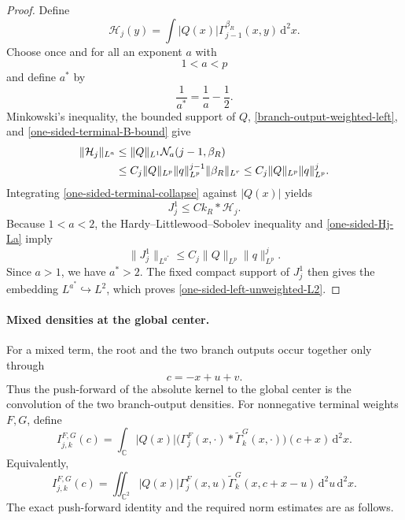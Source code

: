 \documentclass[a4paper,11pt]{article}
\newcommand{\C}{\mathbb{C}}
\newcommand{\dd}{\,\text{d}}
\theoremstyle{plain}
\theoremstyle{definition}
\theoremstyle{remark}
\begin{document}
\begin{proof}
Define
\begin{equation}\label{one-sided-Hj-def}
 \mathcal H_j(y)=\int |Q(x)|\Gamma_{j-1}^{\beta_R}(x,y)\dd^2x.
\end{equation}
Choose once and for all an exponent $a$ with
\begin{equation}\label{one-sided-a-choice}
 1<a<p
\end{equation}
and define $a^*$ by
\begin{equation}\label{one-sided-astar-def}
 \frac1{a^*}=\frac1a-\frac12.
\end{equation}
Minkowski's inequality, the bounded support of $Q$,
\eqref{branch-output-weighted-left}, and
\eqref{one-sided-terminal-B-bound} give
\begin{align}
 \|\mathcal H_j\|_{L^a}
 &\le \|Q\|_{L^1}\mathcal N_a(j-1,\beta_R) \notag\\
 &\le C_j\|Q\|_{L^p}\|q\|_{L^p}^{j-1}\|\beta_R\|_{L^r}
 \le C_j\|Q\|_{L^p}\|q\|_{L^p}^{j}.
 \label{one-sided-Hj-La}
\end{align}
Integrating \eqref{one-sided-terminal-collapse} against $|Q(x)|$ yields
\begin{equation}\label{one-sided-Jj-Hj}
 J_j^1\le C k_R*\mathcal H_j.
\end{equation}
Because $1<a<2$, the Hardy--Littlewood--Sobolev inequality and
\eqref{one-sided-Hj-La} imply
\begin{equation}\label{one-sided-Jj-Lastar}
 \|J_j^1\|_{L^{a^*}}
 \le C_j\|Q\|_{L^p}\|q\|_{L^p}^j.
\end{equation}
Since $a>1$, we have $a^*>2$.  The fixed compact support of $J_j^1$ then gives the embedding $L^{a^*}\hookrightarrow L^2$, which proves \eqref{one-sided-left-unweighted-L2}.
\end{proof}


\paragraph{Mixed densities at the global center.}
\label{subsubsec-mixed-center-densities}

For a mixed term, the root and the two branch outputs occur together only through
\[
        c=-x+u+v.
\]
Thus the push-forward of the absolute kernel to the global center is the convolution of the two branch-output densities.  For nonnegative terminal weights $F,G$, define
\begin{equation}\label{mixed-center-density-def}
 I_{j,k}^{F,G}(c)
 =\int_{\C}|Q(x)|
   \bigl(\Gamma_j^F(x,\cdot)
         *\widetilde\Gamma_k^G(x,\cdot)\bigr)(c+x)
   \dd^2x .
\end{equation}
Equivalently,
\begin{equation}\label{mixed-center-density-expanded}
 I_{j,k}^{F,G}(c)
 =\iint_{\C^2}|Q(x)|\Gamma_j^F(x,u)
       \widetilde\Gamma_k^G(x,c+x-u)
       \dd^2u\dd^2x .
\end{equation}
The exact push-forward identity and the required norm estimates are as follows.
\end{document}
